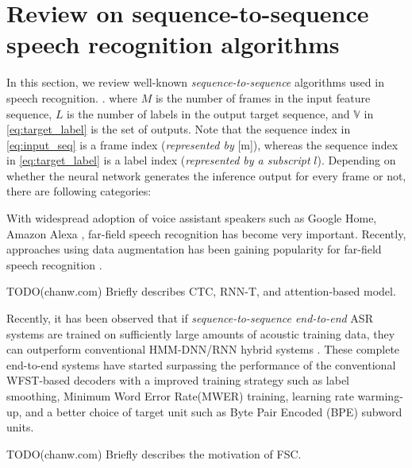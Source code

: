 \documentclass{article}
\begin{document}
\section{Review on sequence-to-sequence speech recognition algorithms}

In this section, we review well-known {\it sequence-to-sequence} algorithms
used in speech recognition.
\cite{
j_chorowski_nips_2015_00, 
a_graves_corr_2012_00, 
y_he_icassp_2019_00,
r_prabhavalkar_interspeech_2017_00}. 
where $M$ is the number of frames in the input feature sequence,
$L$ is the number of labels in the output target sequence,
 and $\mathbb{V}$ in \eqref{eq:target_label} is the set of outputs.
Note that the sequence index in \eqref{eq:input_seq} is a frame
index ({\it represented by} [m]), 
whereas the sequence index in \eqref{eq:target_label} is 
a label index ({\it represented by a subscript} $l$). 
Depending on whether the neural network generates
the inference output for every frame or not, there are following
categories:



With widespread adoption of voice assistant speakers
such as Google Home, Amazon Alexa
\cite{B_Li_INTERSPEECH_2017_1, C_Kim_INTERSPEECH_2017_1},
far-field speech recognition has become very important.
Recently, approaches using data augmentation
has been gaining popularity for far-field speech recognition
\cite{R_Lippmann_icassp_1987_1,
c_kim_interspeech_2018_00, w_hartmann_interspeech_2016_00}.

TODO(chanw.com) Briefly describes CTC, RNN-T, and attention-based model.

Recently, it has been observed that if 
{\it sequence-to-sequence end-to-end} ASR systems are trained on sufficiently 
large amounts of acoustic training data, they can outperform
conventional HMM-DNN/RNN hybrid systems \cite{c_chiu_icassp_2018_00, 
c_kim_interspeech_2019_00}.
These complete end-to-end systems have started surpassing the performance of
the conventional WFST-based decoders with a improved training strategy
such as label smoothing, Minimum Word Error Rate(MWER) training, 
learning rate warming-up,
and a better choice of target unit such as Byte Pair Encoded (BPE) 
\cite {r_sennrich_acl_2016_00} subword units.

TODO(chanw.com) Briefly describes the motivation of FSC.
\end{document}
